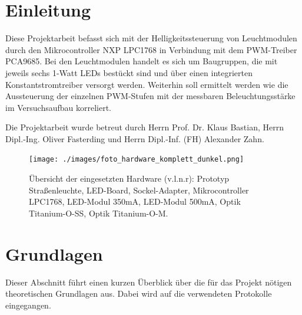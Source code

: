 \documentclass[a4paper,12pt]{scrartcl}
\begin{document}

\tableofcontents

\clearpage

\onehalfspacing


\clearpage
\listoffigures

\clearpage
\section{Einleitung}
Diese Projektarbeit befasst sich mit der Helligkeitssteuerung von Leuchtmodulen durch den Mikrocontroller NXP LPC1768 in Verbindung mit dem PWM-Treiber PCA9685. Bei den Leuchtmodulen handelt es sich um Baugruppen, die mit jeweils sechs 1-Watt LEDs bestückt sind und über einen integrierten Konstantstromtreiber versorgt werden. Weiterhin soll ermittelt werden wie die Aussteuerung der einzelnen PWM-Stufen mit der messbaren Beleuchtungsstärke im Versuchsaufbau korreliert. 

Die Projektarbeit wurde betreut durch Herrn Prof. Dr. Klaus Bastian, Herrn Dipl.-Ing. Oliver Fasterding und Herrn Dipl.-Inf. (FH) Alexander Zahn.
\begin{figure}[htb]
  \begin{center}
    \texttt{[image: ./images/foto\_hardware\_komplett\_dunkel.png]}
  \end{center}
\caption[C\"Ubersicht der eingesetzten Hardware, Quelle: Autoren]{\label{fotohwuebersicht}\"Ubersicht der eingesetzten Hardware (v.l.n.r): Prototyp Straßenleuchte, LED-Board, Sockel-Adapter, Mikrocontroller LPC1768, LED-Modul 350mA, LED-Modul 500mA, Optik Titanium-O-SS, Optik Titanium-O-M.}
\end{figure}

\clearpage
\section{Grundlagen}

Dieser Abschnitt führt einen kurzen Überblick über die für das Projekt nötigen theoretischen Grundlagen aus. Dabei wird auf die verwendeten Protokolle eingegangen.
\end{document}

